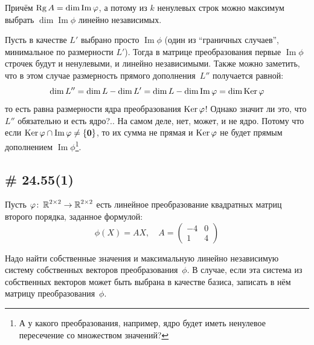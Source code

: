 \documentclass[a4paper,12pt]{article}
\DeclareMathOperator{\Imag}{Im}
\begin{document}
\begin{solution}
    Причём $\Rg A \hm= \dim\Imag\phi$, а потому из $k$ ненулевых строк можно максимум выбрать $\dim\Imag\phi$ линейно независимых.
    
    \medskip
    
    Пусть в качестве $L'$ выбрано просто $\Imag\phi$ (один из ``граничных случаев'', минимальное по размерности $L'$).
    Тогда в матрице преобразования первые $\Imag\phi$ строчек будут и ненулевыми, и линейно независимыми.
    Также можно заметить, что в этом случае размерность прямого дополнения~$L''$ получается равной:
    \[
      \dim L'' = \dim L - \dim L' = \dim L - \dim\Imag\phi = \dim\Ker\phi
    \]
    то есть равна размерности ядра преобразования $\operatorname{Ker}\varphi$!
    Однако значит ли это, что $L''$ обязательно и есть ядро?..
    На самом деле, нет, может, и не ядро.
    Потому что если $\Ker\phi \hm\cap \Imag\phi \hm{\not=} \{\bds 0\}$, то их сумма не прямая и $\operatorname{Ker}\varphi$ не будет прямым дополнением $\Imag\phi$\footnote{А у какого преобразования, например, ядро будет иметь ненулевое пересечение со множеством значений?}.
  \end{solution}
  
  
  \subsection{\# 24.55(1)}
  
  Пусть $\phi\colon \RR^{2\times 2} \hm\to \RR^{2\times 2}$ есть линейное преобразование квадратных матриц второго порядка, заданное формулой:
  \[
    \phi(X) = AX,\quad A = \begin{pmatrix}
      -4 & 0\\
      1 & 4
    \end{pmatrix}
  \]
  
  Надо найти собственные значения и максимальную линейно независимую систему собственных векторов преобразования~$\phi$.
  В случае, если эта система из собственных векторов может быть выбрана в качестве базиса, записать в нём матрицу преобразования~$\phi$.
  
  \renewcommand\qedsymbol{$\blacksquare$}
  
\end{document}
